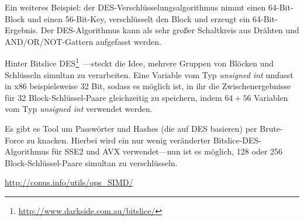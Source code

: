 Ein weiteres Beispiel: der DES-Verschlüsselungsalgorithmus nimmt einen 64-Bit-Block und einen 56-Bit-Key, verschlüsselt
den Block und erzeugt ein 64-Bit-Ergebnis. 
Der DES-Algorithmus kann als sehr großer Schaltkreis aus Drähten und AND/OR/NOT-Gattern aufgefasst werden.

\label{bitslicedes}
\newcommand{\URLBS}{\url{http://www.darkside.com.au/bitslice/}}
Hinter Bitslice DES\footnote{\URLBS}~---steckt die Idee, mehrere Gruppen von Blöcken und Schlüsseln simultan zu
verarbeiten. Eine Variable vom Typ \emph{unsigned int} umfasst in x86 beispielsweise 32 Bit, sodass es möglich ist, in ihr
die Zwischenergebnisse für 32 Block-Schlüssel-Paare gleichzeitig zu speichern, indem $64+56$ Variablen vom Typ
\emph{unsigned int} verwendet werden.

\myindex{\oracle}
Es gibt es Tool um \oracle Passwörter und Hashes (die auf DES basieren) per Brute-Force zu knacken. Hierbei wird ein nur
wenig veränderter Bitslice-DES-Algorithmus für SSE2 und AVX verwendet---nun ist es möglich, 128 oder 256
Block-Schlüssel-Paare simultan zu verschlüsseln.

\url{http://conus.info/utils/ops_SIMD/}




